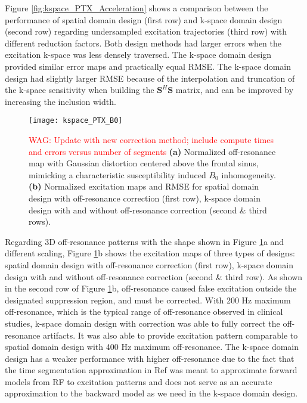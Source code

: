 Figure \ref{fig:kspace_PTX_Acceleration} shows a comparison between the performance of spatial domain design (first row) and k-space domain design (second row) regarding undersampled excitation trajectories (third row) with different reduction factors. Both design methods had larger errors when the excitation k-space was less densely traversed. The k-space domain design provided similar error maps and practically equal RMSE. The k-space domain design had slightly larger RMSE because of the interpolation and truncation of the k-space sensitivity when building the $\mathbf{S}^{H}\mathbf{S}$ matrix, and can be improved by increasing the inclusion width. 


\begin{figure}
	\centering
	\texttt{[image: kspace\_PTX\_B0]}
	\caption{\textcolor{red}{WAG: Update with new correction method; include compute times and errors versus number of segments}
	\textbf{(a)} Normalized off-resonance map with Gaussian distortion centered above the frontal sinus, mimicking a characteristic susceptibility induced $B_0$ inhomogeneity. \textbf{(b)} Normalized excitation maps and RMSE for spatial domain design with off-resonance correction (first row), k-space domain design with and without off-resonance correction (second \& third rows).}
	\label{fig:kspace_PTX_B0}
\end{figure}

Regarding 3D off-resonance patterns with the shape shown in Figure \ref{fig:kspace_PTX_B0}a and different scaling, Figure \ref{fig:kspace_PTX_B0}b shows the excitation maps of three types of designs: spatial domain design with off-resonance correction (first row), k-space domain design with and without off-resonance correction (second \& third row). As shown in the second row of Figure \ref{fig:kspace_PTX_B0}b, off-resonance caused false excitation outside the designated suppression region, and must be corrected. With 200 Hz maximum off-resonance, which is the typical range of off-resonance observed in clinical studies, k-space domain design with correction was able to fully correct the off-resonance artifacts. It was also able to provide excitation pattern comparable to spatial domain design with 400 Hz maximum off-resonance. The k-space domain design has a weaker performance with higher off-resonance due to the fact that the time segmentation approximation in Ref \cite{fessler2005toeplitz} was meant to approximate forward models from RF to excitation patterns and does not serve as an accurate approximation to the backward model as we need in the k-space domain design.